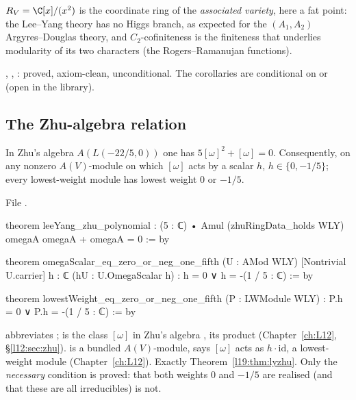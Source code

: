 \begin{physics}
$R_V = \C[x]/(x^2)$ is the coordinate ring of the \emph{associated variety}, here a fat point:
the Lee--Yang theory has no Higgs branch, as expected for the $(A_1,A_2)$ Argyres--Douglas theory, and
$C_2$-cofiniteness is the finiteness that underlies modularity of its two characters (the
Rogers--Ramanujan functions).
\end{physics}

\begin{status}
, , : proved,
axiom-clean, unconditional. The  corollaries are conditional on
 or  (open in the library).
\end{status}

\subsection{The Zhu-algebra relation}

\begin{theorem}\label{l19:thm:lyzhu}
In Zhu's algebra $A(L(-22/5,0))$ one has $5[\omega]^2+[\omega] = 0$. Consequently, on any nonzero
$A(V)$-module on which $[\omega]$ acts by a scalar $h$, $h\in\{0,-1/5\}$; every lowest-weight module has
lowest weight $0$ or $-1/5$.
\end{theorem}

\noindent File .
\begin{leancode}
theorem leeYang_zhu_polynomial :
    (5 : ℂ) • Amul (zhuRingData_holds WLY) omegaA omegaA + omegaA = 0 := by

theorem omegaScalar_eq_zero_or_neg_one_fifth (U : AMod WLY) [Nontrivial U.carrier]
    {h : ℂ} (hU : U.OmegaScalar h) : h = 0 ∨ h = -(1 / 5 : ℂ) := by

theorem lowestWeight_eq_zero_or_neg_one_fifth (P : LWModule WLY) :
    P.h = 0 ∨ P.h = -(1 / 5 : ℂ) := by
\end{leancode}

\begin{dictionary}
 abbreviates ;  is the class $[\omega]$ in Zhu's
algebra ,  its product (Chapter~\ref{ch:L12}, \S\ref{l12:sec:zhu}).
 is a bundled $A(V)$-module,  says $[\omega]$ acts as $h\cdot\mathrm{id}$,
 a lowest-weight module (Chapter~\ref{ch:L12}). Exactly Theorem~\ref{l19:thm:lyzhu}. Only
the \emph{necessary} condition is proved: that both weights $0$ and $-1/5$ are realised (and that these are all
irreducibles) is not.
\end{dictionary}

